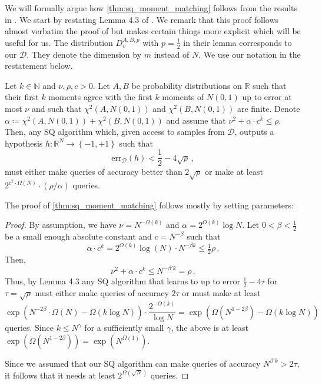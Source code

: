 \documentclass{theoretics}
\newcommand{\Paren}[1]{\left(#1\right)}
\newcommand{\Set}[1]{\left\{#1\right\}}
\newcommand{\N}{\mathbb N}
\newcommand{\R}{\mathbb R}
\newcommand{\cD}{\mathcal D}
\renewcommand{\leq}{\leqslant}
\newcommand{\err}{\mathrm{err}}
\begin{document}
We will formally argue how \cref{thm:sq_moment_matching} follows from the results in \cite{DK22,NT22}.
We start by restating Lemma 4.3 of \cite{NT22}.
We remark that this proof follows almost verbatim the proof of \cite{DK22} but makes certain things more explicit which will be useful for us.
The distribution $D_v^{A,B,p}$ with $p = \tfrac 1 2$ in their lemma corresponds to our $\cD$.
They denote the dimension by $m$ instead of $N$.
We use our notation in the restatement below.
\begin{lemma}
    Let $k \in \N$ and $\nu, \rho, c > 0$.
    Let $A,B$ be probability distributions on $\R$ such that their first $k$ moments agree with the first $k$ moments of $N(0,1)$ up to error at most $\nu$ and such that $\chi^2(A,N(0,1))$ and $\chi^2(B,N(0,1))$ are finite.
    Denote $\alpha \coloneqq \chi^2(A,N(0,1)) + \chi^2(B,N(0,1))$ and assume that $\nu^2 + \alpha \cdot c^k \leq \rho$.
    Then, any SQ algorithm which, given access to samples from $\cD$, outputs a hypothesis $h \colon \R^N \rightarrow \Set{-1,+1}$ such that
    \[
        \err_\cD(h) < \frac 1 2 - 4\sqrt{\rho} \,,
    \]
    must either make queries of accuracy better than $2\sqrt{\rho}$ or make at least $2^{c^2 \cdot \Omega(N)}\cdot (\rho/\alpha)$ queries.
\end{lemma}

The proof of \cref{thm:sq_moment_matching} follows mostly by setting parameters:
\begin{proof}
    By assumption, we have $\nu = N^{-\Omega(k)}$ and $\alpha = 2^{O(k)} \log N$.
    Let $0 < \beta < \tfrac 1 2$ be a small enough absolute constant and $c = N^{-\beta}$ such that
    \[
        \alpha \cdot c^k = 2^{O(k)} \log (N) \cdot N^{-\beta k} \leq \tfrac 1 2\rho \,. 
    \]
    Then,
    \[
        \nu^2 + \alpha \cdot c^k \leq N^{-\beta' k} = \rho\,.
    \]
    Thus, by Lemma 4.3 any SQ algorithm that learns to up to error $\tfrac 1 2 - 4 \tau$ for $\tau = \sqrt{\rho}$ must either make queries of accuracy $2\tau$ or must make at least
    \[
        \exp\Paren{N^{-2\beta} \cdot \Omega(N) - \Omega(k \log N)} \cdot \frac{2^{-O(k)}}{\log N} =  \exp\Paren{\Omega(N^{1-2\beta}) - \Omega(k \log N)}
    \]
    queries.
    Since $k \leq N^\gamma$ for a sufficiently small $\gamma$, the above is at least $\exp\Paren{ \Omega(N^{1-2\beta})} = \exp(N^{\Omega(1)})$.

    Since we assumed that our SQ algorithm can make queries of accuracy $N^{\beta'k} > 2 \tau$, it follows that it needs at least $2^{\Omega(\sqrt{N})}$ queries.
\end{proof}
\end{document}
